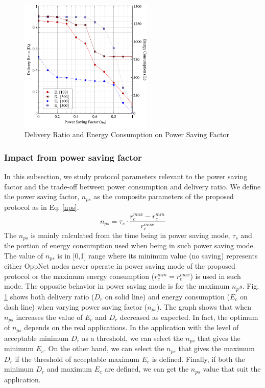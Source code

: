 \documentclass[conference]{IEEEtran}
\begin{document}
\begin{figure}[!t]
\centering
\includegraphics[width=2.5in]{Graphs/NpsDeliveryPerformanceAndDeliveryRatio.pdf}
\caption{Delivery Ratio and Energy Consumption on Power Saving Factor}
\label{The Optimum between Delivery Ratio and protocol Performance}
\end{figure}

\subsubsection{Impact from power saving factor}

In this subsection, we study protocol parameters relevant to the power saving factor and the trade-off between power consumption and delivery ratio.
%
We define the power saving factor, $n_{ps}$ as the composite parameters of the proposed protocol as in Eq. \ref{nps}.
%
\begin{equation}
{ n }_{ ps }={ \tau  }_{ s }\cdot \frac { { r }_{ c }^{ max }-{ r }_{ c }^{ min } }{ { r }_{ c }^{ max } } 
\label{nps}
\end{equation}
The $n_{ps}$ is mainly calculated from the time being in power saving mode, $\tau_s$ and the portion of energy consumption used when being in such power saving mode.
%
The value of $n_{ps}$ is in [0,1] range where its minimum value (no saving) represents either OppNet nodes never operate in power saving mode of the proposed protocol or the maximum energy consumption ($r_c^{min} = r_c^{max}$) is used in such mode.
%
The opposite behavior in power saving mode is for the maximum $n_ps$.
%
Fig. \ref{The Optimum between Delivery Ratio and protocol Performance} shows both delivery ratio ($D_r$ on solid line) and energy consumption ($E_c$ on dash line) when varying power saving factor ($n_{ps}$).
%
The graph shows that when $n_{ps}$ increases the value of $E_c$ and $D_r$ decreased as expected.
%
In fact, the optimum of $n_{ps}$ depends on the real applications.
%
In the application with the level of acceptable minimum $D_r$ as a threshold, we can select the $n_{ps}$ that gives the minimum $E_c$.
%
On the other hand, we can select the $n_{ps}$ that gives the maximum $D_r$ if the threshold of acceptable maximum $E_c$ is defined.
%
Finally, if both the minimum $D_r$ and maximum $E_c$ are defined, we can get the $n_{ps}$ value that suit the application.
\end{document}

